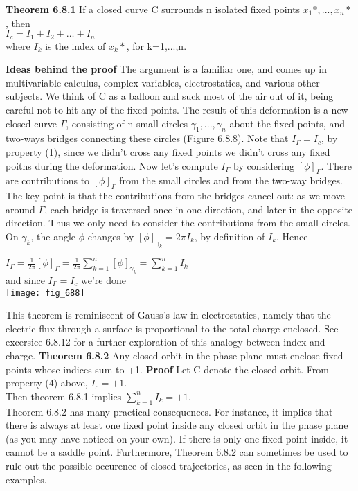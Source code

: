 \documentclass{article}
\newcommand\tab[1][1cm]{\hspace*{#1}}
\begin{document}
\textbf {Theorem 6.8.1} If a closed curve C surrounds n isolated fixed points $x_{1}*,..., x_{n}*$, then \\ \tab
$I_{c}=I_{1}+I_{2}+\hdots + I_{n}$ \\

where $I_{k}$ is the index of $x_{k}*$, for k=1,...,n. 

\textbf {Ideas behind the proof} The argument is a familiar one, and comes up in multivariable calculus, complex variables, electrostatics, and various other subjects. We think of C as a balloon and suck most of the air out of it, being careful not to hit any of the fixed points. The result of this deformation is a new closed curve $\Gamma$, consisting of n small circles $\gamma_{1},...,\gamma_{n}$ about the fixed points, and two-ways bridges connecting these circles (Figure 6.8.8). Note that $I_{\Gamma}=I_{c}$, by property (1), since we didn't cross any fixed points we didn't cross any fixed poitns during the deformation. Now let's compute $I_{\Gamma}$ by considering $[\phi]_{\Gamma}$. There are contributions to $[\phi]_{\Gamma}$ from the small circles and from the two-way bridges. The key point is that the contributions from the bridges cancel out: as we move around $\Gamma$, each bridge is traversed once in one direction, and later in the opposite direction. Thus we only need to consider the contributions from the small circles. On $\gamma_{k}$, the angle $\phi$ changes by $[\phi]_{\gamma_{k}}=2\pi I_{k}$, by definition of $I_{k}$. Hence \\ \tab

$I_{\Gamma}=\frac{1}{2\pi}[\phi]_{\Gamma}= \frac{1}{2\pi} \sum_{k=1}^{n}[\phi]_{\gamma_{k}}=\sum_{k=1}^{n}I_{k}$
\\ and since $I_{\Gamma} = I_{c}$ we're done
\\ \texttt{[image: fig\_688]}

This theorem is reminiscent of Gauss's law in electrostatics, namely that the electric flux through a surface is proportional to the total charge enclosed. See excersice 6.8.12 for a further exploration of this analogy between index and charge. 
\textbf {Theorem 6.8.2} Any closed orbit in the phase plane must enclose fixed points whose indices sum to +1. 
\textbf {Proof} Let C denote the closed orbit. From property (4) above, $I_{c}=+1$. \\
Then theorem 6.8.1 implies $\sum_{k=1}^{n}I_{k}=+1$. \\ \tab
Theorem 6.8.2 has many practical consequences. For instance, it implies that there is always at least one fixed point inside any closed orbit in the phase plane (as you may have noticed on your own). If there is only one fixed point inside, it cannot be a saddle point. Furthermore, Theorem 6.8.2 can sometimes be used to rule out the possible occurence of closed trajectories, as seen in the following examples.
\end{document}
